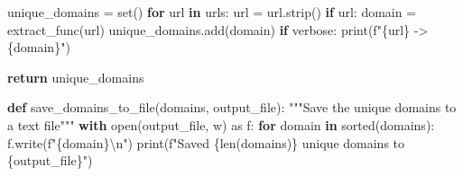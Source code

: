 \documentclass[
  titlepage]{article}
\newenvironment{Shaded}{\begin{snugshade}}{\end{snugshade}}
\newcommand{\BuiltInTok}[1]{\textcolor[rgb]{0.00,0.23,0.31}{#1}}
\newcommand{\CharTok}[1]{\textcolor[rgb]{0.13,0.47,0.30}{#1}}
\newcommand{\CommentTok}[1]{\textcolor[rgb]{0.37,0.37,0.37}{#1}}
\newcommand{\ControlFlowTok}[1]{\textcolor[rgb]{0.00,0.23,0.31}{\textbf{#1}}}
\newcommand{\ImportTok}[1]{\textcolor[rgb]{0.00,0.46,0.62}{#1}}
\newcommand{\KeywordTok}[1]{\textcolor[rgb]{0.00,0.23,0.31}{\textbf{#1}}}
\newcommand{\NormalTok}[1]{\textcolor[rgb]{0.00,0.23,0.31}{#1}}
\newcommand{\OperatorTok}[1]{\textcolor[rgb]{0.37,0.37,0.37}{#1}}
\newcommand{\SpecialCharTok}[1]{\textcolor[rgb]{0.37,0.37,0.37}{#1}}
\newcommand{\SpecialStringTok}[1]{\textcolor[rgb]{0.13,0.47,0.30}{#1}}
\newcommand{\StringTok}[1]{\textcolor[rgb]{0.13,0.47,0.30}{#1}}
\begin{document}
\begin{Shaded}
\begin{Highlighting}[]
\NormalTok{    unique\_domains }\OperatorTok{=} \BuiltInTok{set}\NormalTok{()}
    \ControlFlowTok{for}\NormalTok{ url }\KeywordTok{in}\NormalTok{ urls:}
\NormalTok{        url }\OperatorTok{=}\NormalTok{ url.strip()}
        \ControlFlowTok{if}\NormalTok{ url:}
\NormalTok{            domain }\OperatorTok{=}\NormalTok{ extract\_func(url)}
\NormalTok{            unique\_domains.add(domain)}
            \ControlFlowTok{if}\NormalTok{ verbose:}
                \BuiltInTok{print}\NormalTok{(}\SpecialStringTok{f"}\SpecialCharTok{\{}\NormalTok{url}\SpecialCharTok{\}}\SpecialStringTok{ {-}\textgreater{} }\SpecialCharTok{\{}\NormalTok{domain}\SpecialCharTok{\}}\SpecialStringTok{"}\NormalTok{)}
    
    \ControlFlowTok{return}\NormalTok{ unique\_domains}

\KeywordTok{def}\NormalTok{ save\_domains\_to\_file(domains, output\_file):}
    \CommentTok{"""Save the unique domains to a text file"""}
    \ControlFlowTok{with} \BuiltInTok{open}\NormalTok{(output\_file, }\StringTok{\textquotesingle{}w\textquotesingle{}}\NormalTok{) }\ImportTok{as}\NormalTok{ f:}
        \ControlFlowTok{for}\NormalTok{ domain }\KeywordTok{in} \BuiltInTok{sorted}\NormalTok{(domains):}
\NormalTok{            f.write(}\SpecialStringTok{f"}\SpecialCharTok{\{}\NormalTok{domain}\SpecialCharTok{\}}\CharTok{\textbackslash{}n}\SpecialStringTok{"}\NormalTok{)}
    \BuiltInTok{print}\NormalTok{(}\SpecialStringTok{f"Saved }\SpecialCharTok{\{}\BuiltInTok{len}\NormalTok{(domains)}\SpecialCharTok{\}}\SpecialStringTok{ unique domains to }\SpecialCharTok{\{}\NormalTok{output\_file}\SpecialCharTok{\}}\SpecialStringTok{"}\NormalTok{)}


\end{Highlighting}
\end{Shaded}
\end{document}
